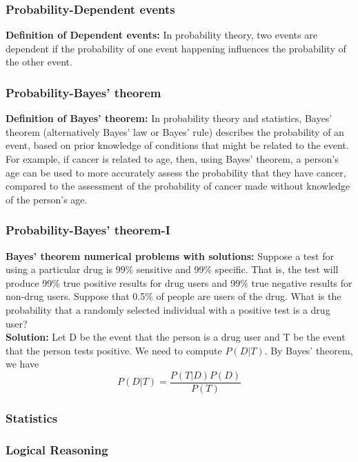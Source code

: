 \documentclass{beamer}
\begin{document}
\begin{frame}
    \frametitle{Probability-Dependent events}
    {\bf Definition of Dependent events:} In probability theory, two events are dependent if the probability of one event happening influences the probability of the other event.\\
\end{frame}


\begin{frame}
    \frametitle{Probability-Bayes' theorem}
    {\bf Definition of Bayes' theorem:} In probability theory and statistics, Bayes' theorem (alternatively Bayes' law or Bayes' rule) describes the probability of an event, based on prior knowledge of conditions that might be related to the event. For example, if cancer is related to age, then, using Bayes' theorem, a person's age can be used to more accurately assess the probability that they have cancer, compared to the assessment of the probability of cancer made without knowledge of the person's age.\\
\end{frame}


\begin{frame}
    \frametitle{Probability-Bayes' theorem-I}
    {\bf Bayes' theorem numerical problems with solutions:} 
    Suppose a test for using a particular drug is 99\% sensitive and 99\% specific. That is, the test will produce 99\% true positive results for drug users and 99\% true negative results for non-drug users. Suppose that 0.5\% of people are users of the drug. What is the probability that a randomly selected individual with a positive test is a drug user?\\

    {\bf Solution:} Let D be the event that the person is a drug user and T be the event that the person tests positive. We need to compute $P(D|T)$. By Bayes' theorem, we have
    \begin{equation}
        P(D|T) = \frac{P(T|D)P(D)}{P(T)}
    \end{equation}
\end{frame}

\begin{frame}
    \frametitle{Statistics}
\end{frame}

\begin{frame}
    \frametitle{Logical Reasoning}
\end{frame}
\end{document}
